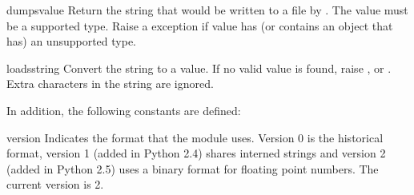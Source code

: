 \begin{funcdesc}{dumps}{value}
  Return the string that would be written to a file by
  .  The value must be a supported
  type.  Raise a  exception if value has (or
  contains an object that has) an unsupported type.

\end{funcdesc}

\begin{funcdesc}{loads}{string}
  Convert the string to a value.  If no valid value is found, raise
  ,  or
  .  Extra characters in the string are ignored.
\end{funcdesc}

In addition, the following constants are defined:

\begin{datadesc}{version}
  Indicates the format that the module uses. Version 0 is the
  historical format, version 1 (added in Python 2.4) shares interned
  strings and version 2 (added in Python 2.5) uses a binary format for
  floating point numbers. The current version is 2.

\end{datadesc}
